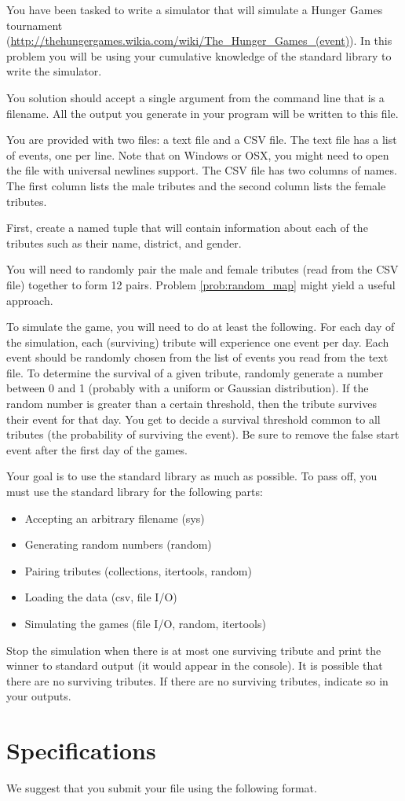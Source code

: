 \begin{problem}
You have been tasked to write a simulator that will simulate a Hunger Games tournament (\url{http://thehungergames.wikia.com/wiki/The_Hunger_Games_(event)}).
In this problem you will be using your cumulative knowledge of the standard library to write the simulator.

You solution should accept a single argument from the command line that is a filename.  All the output you generate in your program will be written to this file.

You are provided with two files: a text file and a CSV file.
The text file has a list of events, one per line.
Note that on Windows or OSX, you might need to open the file with universal newlines support.
The CSV file has two columns of names.
The first column lists the male tributes and the second column lists the female tributes.

First, create a named tuple that will contain information about each of the tributes such as their name, district, and gender.

You will need to randomly pair the male and female tributes (read from the CSV file) together to form 12 pairs.
Problem \ref{prob:random_map} might yield a useful approach.

To simulate the game, you will need to do at least the following.
For each day of the simulation, each (surviving) tribute will experience one event per day. Each event should be randomly chosen from the list of events you read from the text file.
To determine the survival of a given tribute, randomly generate a number between 0 and 1 (probably with a uniform or Gaussian distribution).
If the random number is greater than a certain threshold, then the tribute survives their event for that day.
You get to decide a survival threshold common to all tributes (the probability of surviving the event).
Be sure to remove the false start event after the first day of the games.

Your goal is to use the standard library as much as possible.
To pass off, you must use the standard library for the following parts:
\begin{itemize}
\item Accepting an arbitrary filename (sys)
\item Generating random numbers (random)
\item Pairing tributes (collections, itertools, random)
\item Loading the data (csv, file I/O)
\item Simulating the games (file I/O, random, itertools)
\end{itemize}

Stop the simulation when there is at most one surviving tribute and print the winner to standard output (it would appear in the console).  It is possible that there are no surviving tributes.  If there are no surviving tributes, indicate so in your outputs.

\end{problem}

\section*{Specifications}
We suggest that you submit your  file using the following format.





